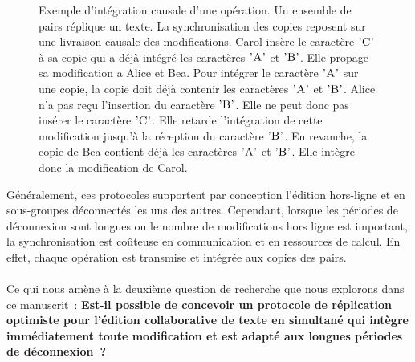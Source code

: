 \begin{figure}[bth]
\begin{subfigure}{.5\linewidth}
\begin{tikzpicture}
    \end{tikzpicture}
    \caption{}\label{fig:op-integration-order-example-2}
\end{subfigure}
\caption[Intégration causale d'une opération]{Exemple d'intégration causale d'une opération.
Un ensemble de pairs réplique un texte.
La synchronisation des copies reposent sur une livraison causale des modifications.
 Carol insère le caractère $\textsc{'C'}$ à sa copie qui a déjà intégré les caractères $\textsc{'A'}$ et $\textsc{'B'}$.
Elle propage sa modification a Alice et Bea.
Pour intégrer le caractère $\textsc{'A'}$ sur une copie, la copie doit déjà contenir les caractères $\textsc{'A'}$ et $\textsc{'B'}$.
Alice n'a pas reçu l'insertion du caractère $\textsc{'B'}$.
Elle ne peut donc pas insérer le caractère $\textsc{'C'}$.
Elle retarde l'intégration de cette modification jusqu'à la réception du caractère $\textsc{'B'}$.
En revanche, la copie de Bea contient déjà les caractères $\textsc{'A'}$ et $\textsc{'B'}$.
 Elle intègre donc la modification de Carol.
}\label{fig:op-integration-order-example}
\end{figure}

Généralement, ces protocoles supportent par conception l'édition hors-ligne et en sous-groupes déconnectés les uns des autres.
Cependant, lorsque les périodes de déconnexion sont longues ou le nombre de modifications hors ligne est important, la synchronisation est coûteuse en communication et en ressources de calcul.
En effet, chaque opération est transmise et intégrée aux copies des pairs.

\paragraph{}Ce qui nous amène à la deuxième question de recherche que nous explorons dans ce manuscrit~: \textbf{Est-il possible de concevoir un protocole de réplication optimiste pour l'édition collaborative de texte en simultané qui intègre immédiatement toute modification et est adapté aux longues périodes de déconnexion~?}

